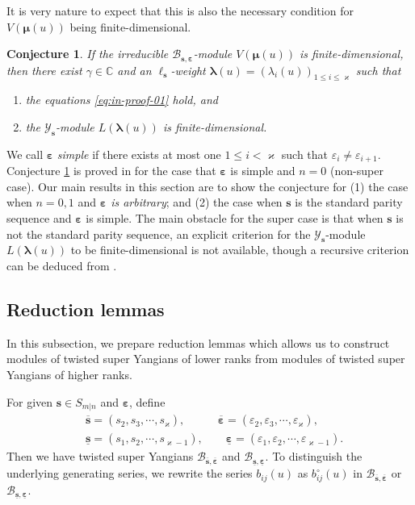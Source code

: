 \documentclass[11pt,reqno]{amsart}
\numberwithin{equation}{section}
\newtheorem{conj}[thm]{Conjecture}
\theoremstyle{definition}
\theoremstyle{remark}
\newcommand{\beq}{\begin{equation}}
\newcommand{\eeq}{\end{equation}}
\newcommand{\bC}{\mathbb{C}}
\newcommand{\lle}{\leqslant}
\newcommand{\la}{\lambda}
\newcommand{\bla}{\bm\lambda}
\newcommand{\YMN}{{\mathscr{Y}_{\bm s}}}
\newcommand{\BMN}{{\mathscr{B}_{\bm s,\bm \ve}}}
\newcommand{\ka}{\varkappa}
\newcommand{\ve}{\varepsilon}
\newcommand{\s}{{\bm s}}
\newcommand{\ovs}{{\overline{\bm s}}}
\newcommand{\ove}{{\overline{\bm \varepsilon}}}
\newcommand{\uns}{{\underline{\bm s}}}
\newcommand{\une}{{\underline{\bm \varepsilon}}}
\begin{document}
It is very nature to expect that this is also the necessary condition for $V(\bm\mu(u))$ being finite-dimensional.

\begin{conj}\label{conj:main}
If the irreducible $\BMN$-module $V(\bm \mu(u))$ is finite-dimensional, then there exist $\gamma\in \bC$ and an  $\ell_\s$-weight $\bm\la(u)=(\la_i(u))_{1\lle i\lle \ka}$ such that
\begin{enumerate}
    \item the equations \eqref{eq:in-proof-01} hold, and
    \item the $\YMN$-module $L(\bla(u))$ is finite-dimensional.
\end{enumerate}
\end{conj}

We call $\bm\ve$ {\it simple} if there exists at most one $1\lle i<\ka$ such that $\ve_i\ne \ve_{i+1}$. Conjecture \ref{conj:main} is proved in \cite{Molev2002reflection} for the case that $\bm\ve$ is simple and $n=0$ (non-super case). Our main results in this section are to show the conjecture for (1) the case when $n=0,1$ and \textit{$\bm\ve$ is arbitrary}; and (2) the case when $\s$ is the standard parity sequence and $\bm\ve$ is simple. The main obstacle for the super case is that when $\bm s$ is not the standard parity sequence, an explicit criterion for the $\YMN$-module $L(\bla(u))$ to be finite-dimensional is not available, though a recursive criterion can be deduced from \cite{Molev2022odd,Lu2022note}.

\subsection{Reduction lemmas}\label{sec:reduct-lem}
In this subsection, we prepare reduction lemmas which allows us to construct modules of twisted super Yangians of lower ranks from  modules of twisted super Yangians of higher ranks.

For given $\bm s\in S_{m|n}$ and $\bm \ve$, define
\beq
\begin{split}
&\overline{\bm s}=(s_2,s_3,\cdots,s_\ka),\qquad \ \ \ \  \overline{\bm\ve}=(\ve_2,\ve_3,\cdots,\ve_\ka),\\
&\underline{\bm s}=(s_1,s_2,\cdots,s_{\ka-1}),\qquad \underline{\bm\ve}=(\ve_1,\ve_2,\cdots,\ve_{\ka-1}).
\end{split}
\eeq
Then we have twisted super Yangians $\mathscr B_{\ovs,\ove}$ and $\mathscr B_{\uns,\une}$. To distinguish the underlying generating series, we rewrite the series ${b}_{ij}(u)$ as ${b}^\circ_{ij}(u)$ in $\mathscr B_{\ovs,\ove}$ or $\mathscr B_{\uns,\une}$.
\end{document}
